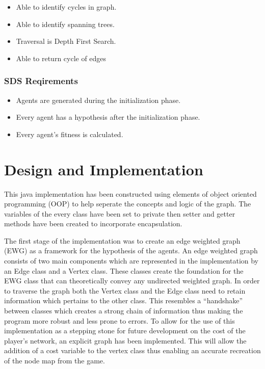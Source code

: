 \documentclass{AISB2008}
\begin{document}
{\begin{itemize}
\item Able to identify cycles in graph.
\item Able to identify spanning trees.
\item Traversal is Depth First Search.
\item Able to return cycle of edges
\end{itemize}


\subsubsection{SDS Reqirements}

\begin{itemize}
\item Agents are generated during the initialization phase.
\item Every agent has a hypothesis after the initialization phase.
\item Every agent’s fitness is calculated.
\end{itemize}


\section{Design and Implementation}

This java implementation has been constructed using elements of object oriented programming (OOP) to help seperate the concepts and logic of the graph. The variables of the every class have been set to private then setter and getter methods have been created to incorporate encapsulation.

The first stage of the implementation was to create an edge weighted graph (EWG) as a framework for the hypothesis of the agents. An edge weighted graph consists of two main components which are represented in the implementation by an Edge class and a Vertex class.  These classes create the foundation for the EWG class that can theoretically convey any undirected weighted graph. In order to traverse the graph both the Vertex class and the Edge class need to retain information which pertains to the other class. This resembles a “handshake” between classes which creates a strong chain of information thus making the program more robust and less prone to errors. To allow for the use of this implementation as a stepping stone for future development on the cost of the player’s network, an explicit graph has been implemented. This will allow the addition of a cost variable to the vertex class thus enabling an accurate recreation of the node map from the game.

}
\end{document}
